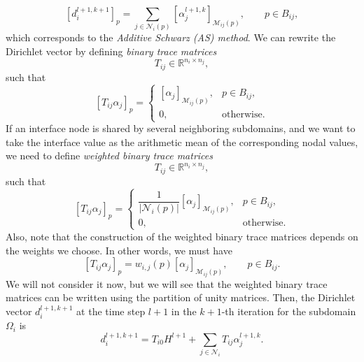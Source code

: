 \documentclass[a4paper, 11pt]{article}
\theoremstyle{plain}
\theoremstyle{definition}
\theoremstyle{remark}
\begin{document}
\begin{equation*}
    \left[d^{l+1, k+1}_{i}\right]_{p} = \sum\limits_{j\in\mathcal{N}_{i}(p)} \left[\alpha^{l+1, k}_{j}\right]_{\mathcal{M}_{ij}(p)}, \qquad p\in B_{ij},
\end{equation*}
which corresponds to the \textit{Additive Schwarz (AS) method}. We can rewrite the Dirichlet vector by defining \textit{binary trace matrices}
\begin{equation*}
    T_{ij} \in \mathbb{R}^{n_{i} \times n_{j}},
\end{equation*}
such that
\begin{equation*}
    \left[T_{ij}\alpha_{j}\right]_{p} = 
    \begin{cases}
        \left[\alpha_{j}\right]_{\mathcal{M}_{ij}(p)}, & p\in B_{ij},\\
        0, & \text{otherwise}.
    \end{cases}
\end{equation*}
If an interface node is shared by several neighboring subdomains, and we want to take the interface value as the arithmetic mean of the corresponding nodal values, we need to define \textit{weighted binary trace matrices}
\begin{equation*}
    T_{ij} \in \mathbb{R}^{n_{i} \times n_{j}},
\end{equation*}
such that
\begin{equation*}
    \left[T_{ij}\alpha_{j}\right]_{p} = 
    \begin{cases}
        \dfrac{1}{\lvert \mathcal{N}_{i}(p)\rvert}\left[\alpha_{j}\right]_{\mathcal{M}_{ij}(p)}, & p\in B_{ij},\\
        0, & \text{otherwise}.
    \end{cases}
\end{equation*}
Also, note that the construction of the weighted binary trace matrices depends on the weights we choose. In other words, we must have 
\begin{equation*}
    \left[T_{ij}\alpha_{j}\right]_{p} = w_{i, j}(p)\left[\alpha_{j}\right]_{\mathcal{M}_{ij}(p)}, \qquad p\in B_{ij}.
\end{equation*}
We will not consider it now, but we will see that the weighted binary trace matrices can be written using the partition of unity matrices. Then, the Dirichlet vector $d^{l+1, k+1}_{i}$ at the time step $l+1$ in the $k+1$-th iteration for the subdomain $\Omega_i$ is
\begin{equation*}
    d^{l+1, k+1}_{i} = T_{i0}H^{l+1} + \sum_{j\in\mathcal{N}_{i}}T_{ij}\alpha^{l+1, k}_{j}.
\end{equation*}
\end{document}
